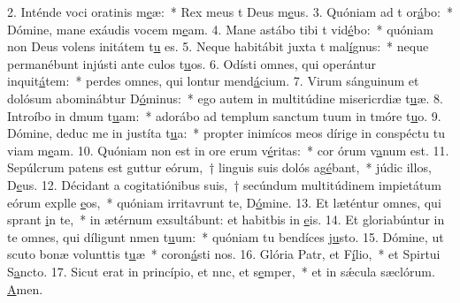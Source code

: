 2. Inténde voci oratinis m\uline{e}æ:~* Rex meus t Deus m\uline{e}us.
3. Quóniam ad t or\uline{á}bo:~* Dómine, mane exáudis vocem m\uline{e}am.
4. Mane astábo tibi t vid\uline{é}bo:~* quóniam non Deus volens initátem t\uline{u} es.
5. Neque habitábit juxta t mal\uline{í}gnus:~* neque permanébunt injústi ante culos t\uline{u}os.
6. Odísti omnes, qui operántur inquit\uline{á}tem:~* perdes omnes, qui lontur mend\uline{á}cium.
7. Virum sánguinum et dolósum abominábtur D\uline{ó}minus:~* ego autem in multitúdine misericrdiæ t\uline{u}æ.
8. Introíbo in dmum t\uline{u}am:~* adorábo ad templum sanctum tuum in tmóre t\uline{u}o.
9. Dómine, deduc me in justíta t\uline{u}a:~* propter inimícos meos dírige in conspéctu tu viam m\uline{e}am.
10. Quóniam non est in ore erum v\uline{é}ritas:~* cor órum v\uline{a}num est.
11. Sepúlcrum patens est guttur eórum,~† linguis suis dolós ag\uline{é}bant,~* júdic illos, D\uline{e}us.
12. Décidant a cogitatiónibus suis,~† secúndum multitúdinem impietátum eórum explle \uline{e}os,~* quóniam irritavrunt te, D\uline{ó}mine.
13. Et læténtur omnes, qui sprant \uline{i}n te,~* in ætérnum exsultábunt: et habitbis in \uline{e}is.
14. Et gloriabúntur in te omnes, qui díligunt nmen t\uline{u}um:~* quóniam tu bendíces j\uline{u}sto.
15. Dómine, ut scuto bonæ volunttis t\uline{u}æ~* coron\uline{á}sti nos.
16. Glória Patr, et F\uline{í}lio,~* et Spirtui S\uline{a}ncto.
17. Sicut erat in princípio, et nnc, et s\uline{e}mper,~* et in sǽcula sæclórum. \uline{A}men.
